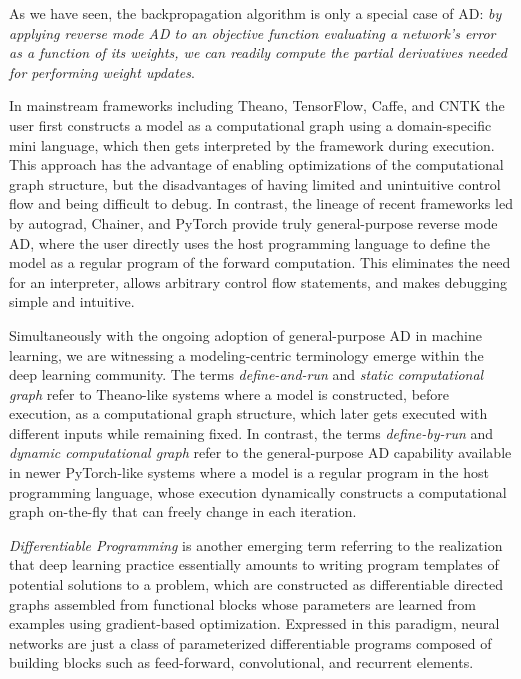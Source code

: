 As we have seen, the backpropagation algorithm is only a special case of AD: \textit{by applying reverse mode AD to an objective function evaluating a network’s error as a function of its weights, we can readily compute the partial derivatives needed for performing weight updates}.

In mainstream frameworks including Theano, TensorFlow, Caffe, and CNTK the user first constructs a model as a computational graph using a domain-specific mini language, which then gets interpreted by the framework during execution. This approach has the advantage of enabling optimizations of the computational graph structure, but the disadvantages of having limited and unintuitive control flow and being difficult to debug. In contrast, the lineage of recent frameworks led by autograd, Chainer, and PyTorch provide truly general-purpose reverse mode AD,
where the user directly uses the host programming language to define the model as a regular program of the forward computation. This eliminates the need for an interpreter, allows arbitrary control flow statements, and makes debugging simple and intuitive.

Simultaneously with the ongoing adoption of general-purpose AD in machine learning, we are witnessing a modeling-centric terminology emerge within the deep learning community. The terms \emph{define-and-run} and \emph{static computational graph} refer to Theano-like systems where a model is constructed, before execution, as a computational graph structure, which later gets executed with different inputs while remaining fixed. In contrast, the terms \emph{define-by-run} and \emph{dynamic computational graph} refer to the general-purpose AD capability available in newer PyTorch-like systems where a model is a regular program in the host programming language, whose execution dynamically constructs a computational graph on-the-fly that can freely change in each iteration.

\emph{Differentiable Programming} is another emerging term referring to the realization that deep learning practice essentially amounts to writing program templates of potential solutions to a problem, which are constructed as differentiable directed graphs assembled from functional blocks whose parameters are learned from examples using gradient-based optimization. Expressed in this paradigm, neural networks are just a class of parameterized
differentiable programs composed of building blocks such as feed-forward, convolutional, and recurrent elements.
























